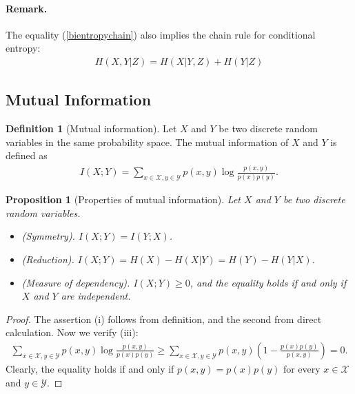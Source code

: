 \documentclass{article}
\numberwithin{equation}{section}
\theoremstyle{plain}
\newtheorem{proposition}[theorem]{Proposition}
\theoremstyle{definition}
\newtheorem{definition}[theorem]{Definition}
\begin{document}
\paragraph{Remark.} The equality (\ref{bientropychain}) also implies the chain rule for conditional entropy:
\begin{align*}
	H(X,Y|Z)=H(X|Y,Z)+H(Y|Z)
\end{align*}

\subsection{Mutual Information}
\begin{definition}[Mutual information]\label{mutualinfodef}
Let $X$ and $Y$ be two discrete random variables in the same probability space. The mutual information of $X$ and $Y$ is defined as
\begin{align*}
	I(X;Y)=\sum_{x\in\mathcal{X},y\in\mathcal{Y}}p(x,y)\log\frac{p(x,y)}{p(x)p(y)}.
\end{align*}
\end{definition}
\begin{proposition}[Properties of mutual information]\label{propmutualinfo}
	Let $X$ and $Y$ be two discrete random variables.
	\begin{itemize}
		\item[(i)] (Symmetry). $I(X;Y)=I(Y;X)$.
		\item[(ii)] (Reduction). $I(X;Y)=H(X)-H(X|Y)=H(Y)-H(Y|X)$.
		\item[(iii)] (Measure of dependency). $I(X;Y)\geq 0$, and the equality holds if and only if $X$ and $Y$ are independent.
	\end{itemize}
\end{proposition}
\begin{proof}
The assertion (i) follows from definition, and the second from direct calculation. Now we verify (iii):
\begin{align*}
	\sum_{x\in\mathcal{X},y\in\mathcal{Y}}p(x,y)\log\frac{p(x,y)}{p(x)p(y)}\geq\sum_{x\in\mathcal{X},y\in\mathcal{Y}}p(x,y)\left(1-\frac{p(x)p(y)}{p(x,y)}\right)=0.
\end{align*}
Clearly, the equality holds if and only if $p(x,y)=p(x)p(y)$ for every $x\in\mathcal{X}$ and $y\in\mathcal{Y}$.
\end{proof}
\end{document}
